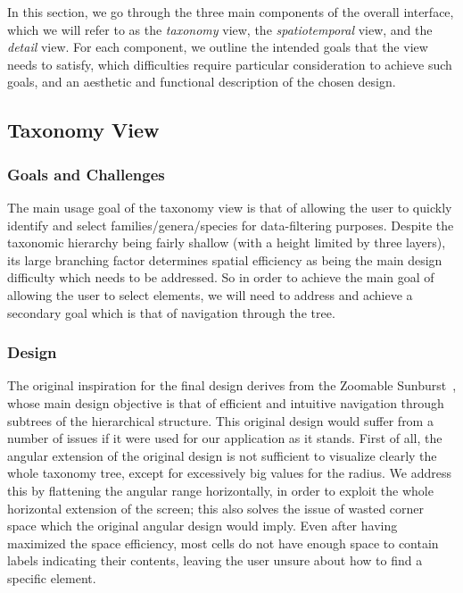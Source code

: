 \documentclass[letterpaper]{article} %
\begin{document}
In this section, we go through the three main components of the overall
interface, which we will refer to as the \emph{taxonomy} view, the
\emph{spatiotemporal} view, and the \emph{detail} view.  For each component, we
outline the intended goals that the view needs to satisfy, which difficulties
require particular consideration to achieve such goals, and an aesthetic and
functional description of the chosen design.

\subsection{Taxonomy View}

\subsubsection{Goals and Challenges}

The main usage goal of the taxonomy view is that of allowing the user to
quickly identify and select families/genera/species for data-filtering
purposes.  Despite the taxonomic hierarchy being fairly shallow (with a height
limited by three layers), its large branching factor determines spatial
efficiency as being the main design difficulty which needs to be addressed.  So
in order to achieve the main goal of allowing the user to select elements, we
will need to address and achieve a secondary goal which is that of navigation
through the tree.

\subsubsection{Design}

The original inspiration for the final design derives from the Zoomable
Sunburst~\cite{sunburst}, whose main design objective is that of efficient and
intuitive navigation through subtrees of the hierarchical structure.  This
original design would suffer from a number of issues if it were used for our
application as it stands.  First of all, the angular extension of the original
design is not sufficient to visualize clearly the whole taxonomy tree, except
for excessively big values for the radius.  We address this by flattening the
angular range horizontally, in order to exploit the whole horizontal extension
of the screen;  this also solves the issue of wasted corner space which the
original angular design would imply.  Even after having maximized the space
efficiency, most cells do not have enough space to contain labels indicating
their contents, leaving the user unsure about how to find a specific element.
\end{document}
